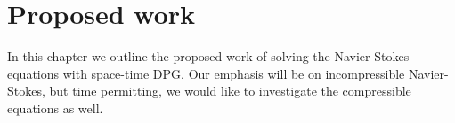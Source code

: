 \documentclass[Proposal.tex]{subfiles}
\begin{document}
\chapter{Proposed work}
In this chapter we outline the proposed work of solving the Navier-Stokes equations with space-time DPG. 
Our emphasis will be on incompressible Navier-Stokes, but time permitting, we would like to investigate the compressible equations as well.

\end{document}
